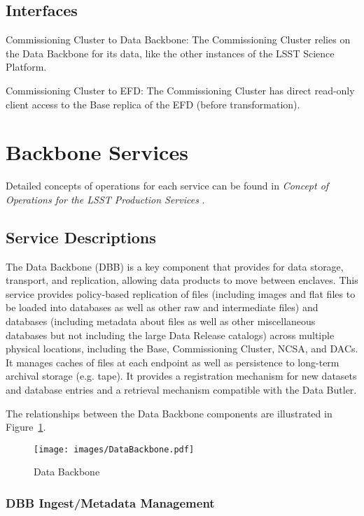 \documentclass[DM,toc,lsstdraft]{lsstdoc}
\begin{document}
\subsection{Interfaces}\label{commcluster-interfaces}

Commissioning Cluster to Data Backbone: The Commissioning Cluster relies on the
Data Backbone for its data, like the other instances of the LSST Science
Platform.

Commissioning Cluster to EFD: The Commissioning Cluster has direct read-only
client access to the Base replica of the EFD (before transformation).

\section{Backbone Services}\label{backbone-services}

Detailed concepts of operations for each service can be found in \textit{Concept of Operations for the LSST Production Services} .

\subsection{Service Descriptions}\label{backbone-service-descriptions}

The Data Backbone (DBB) is a key component that provides for data storage, transport, and replication, allowing data products to move between enclaves.
This service provides policy-based replication of files (including images and flat files to be loaded into databases as well as other raw and intermediate files) and databases (including metadata about files as well as other miscellaneous databases but not including the large Data Release catalogs) across multiple physical locations, including the Base, Commissioning Cluster, NCSA, and DACs.
It manages caches of files at each endpoint as well as persistence to long-term archival storage (e.g. tape).
It provides a registration mechanism for new datasets and database entries and a retrieval mechanism compatible with the Data Butler.

The relationships between the Data Backbone components are illustrated
in Figure~\ref{fig:dbb}.

\begin{figure}
\centering
\texttt{[image: images/DataBackbone.pdf]}
\caption{Data Backbone}
\label{fig:dbb}
\end{figure}

\subsubsection{DBB Ingest/Metadata Management}\label{dbb-ingest-metadata}
\end{document}
